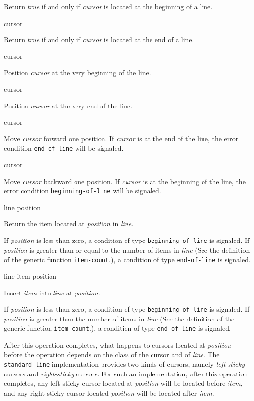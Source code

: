Return \textit{true} if and only if \textit{cursor} is located at the
beginning of a line.

 {cursor}

Return \textit{true} if and only if \textit{cursor} is located at the
end of a line.

 {cursor}

Position \textit{cursor} at the very beginning of the line.

 {cursor}

Position \textit{cursor} at the very end of the line.

 {cursor}

Move \textit{cursor} forward one position.  If \emph{cursor} is at the
end of the line, the error condition \texttt{end-of-line} will be
signaled.

 {cursor}

Move \textit{cursor} backward one position.  If \emph{cursor} is at
the beginning of the line, the error condition
\texttt{beginning-of-line} will be signaled.

 {line position}

Return the item located at \textit{position} in \textit{line}.

If \textit{position} is less than zero, a condition of type
\texttt{beginning-of-line} is signaled.  If \textit{position} is
greater than or equal to the number of items in \textit{line} (See the
definition of the generic function \texttt{item-count}.), a condition
of type \texttt{end-of-line} is signaled.

 {line item position}

Insert \textit{item} into \textit{line} at \textit{position}.

If \textit{position} is less than zero, a condition of type
\texttt{beginning-of-line} is signaled.  If \textit{position} is
greater than the number of items in \textit{line} (See the definition
of the generic function \texttt{item-count}.), a condition of type
\texttt{end-of-line} is signaled.

After this operation completes, what happens to cursors located at
\textit{position} before the operation depends on the class of the
cursor and of \textit{line}.  The \texttt{standard-line}
implementation provides two kinds of cursors, namely
\emph{left-sticky} cursors and \emph{right-sticky} cursors.  For such
an implementation, after this operation completes, any left-sticky
cursor located at \textit{position} will be located before
\textit{item}, and any right-sticky cursor located \textit{position}
will be located after \textit{item}.


